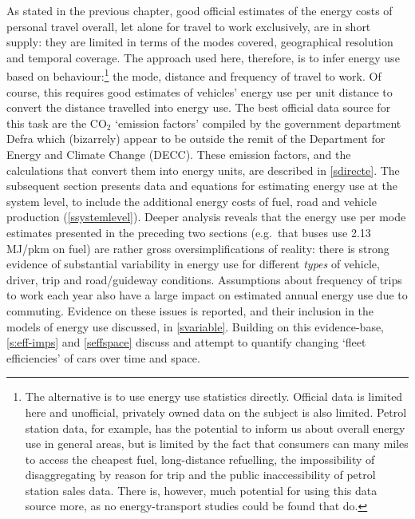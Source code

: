 As stated in the previous chapter, good official estimates of the energy costs of personal
travel overall, let alone for travel to work exclusively, are in short supply:
they are limited in terms of the modes covered, geographical resolution and
temporal coverage.
The approach used here, therefore, is to infer
energy use based on
behaviour:\footnote{The
alternative is to use energy use statistics directly.
Official data is limited here and unofficial, privately owned
data on the subject is also limited. Petrol
station data, for example,
has the potential to inform us about overall energy use in
general areas, but is limited by the fact that consumers can many miles to
access the cheapest fuel, long-distance refuelling, the impossibility
of disaggregating by reason for trip and the public inaccessibility of petrol
station sales data. There is, however, much potential for using this data
source more, as no energy-transport studies could be found that do.
}
the mode, distance and frequency of
travel to work. Of course, this requires good estimates of vehicles' energy use
per unit distance to convert the distance travelled into energy use. The best
official data source for this task are the CO$_2$ `emission factors'
compiled by the government department Defra which (bizarrely) appear
to be outside the remit of
the Department for Energy and Climate Change (DECC).
These emission factors, and the calculations that convert them into
energy units, are described in \cref{sdirecte}. The subsequent section presents
data and equations for estimating energy use at the system level, to include
the additional energy costs of fuel, road and vehicle production
(\cref{ssystemlevel}). Deeper analysis reveals that the energy use per mode
estimates presented in the preceding two sections
(e.g.~that buses use 2.13 MJ/pkm on fuel) are rather gross oversimplifications
of reality: there is strong evidence of substantial variability in energy use
for different \emph{types} of vehicle, driver, trip and road/guideway
conditions. Assumptions about frequency of trips to work each year also
have a large impact on estimated annual energy use due to commuting.
Evidence on these issues is reported, and their inclusion in the models
of energy use discussed, in \cref{svariable}. Building on this evidence-base,
\cref{s:eff-imps} and \cref{seffspace} discuss and attempt to quantify
changing `fleet efficiencies' of cars over time and space. %

